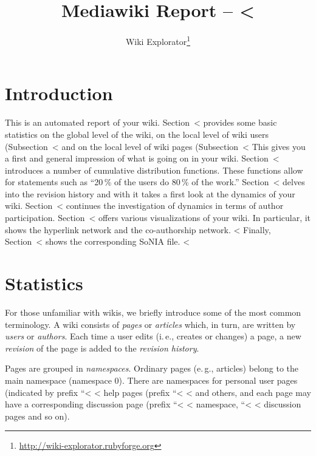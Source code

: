 \documentclass{scrartcl}
\title{Mediawiki Report -- <%
}
\author{Wiki Explorator\footnote{\protect\url{http://wiki-explorator.rubyforge.org}}}
\begin{document}
\maketitle

\section{Introduction} %
\label{sec:introduction}

This is an automated report of your wiki. 
Section~<%
provides some basic statistics on the global level of the wiki,
on the local level of wiki users (Subsection~<%
and on the local level of wiki pages (Subsection~<%
This gives you a first and general impression of what is 
going on in your wiki. 
Section~<%
introduces a number of cumulative distribution functions. 
These functions allow for statements such as ``20\,\% of 
the users do 80\,\% of the work.'' 
Section~<%
delves into the revision history and with it takes a 
first look at the dynamics of your wiki. 
Section~<%
continues the investigation of dynamics in terms of author participation. 
Section~<%
offers various visualizations of your wiki. In particular, it shows 
the hyperlink network and the co-authorship network.
<%
Finally, Section~<%
shows the corresponding SoNIA file.
<%


\section{Statistics} %
\label{sec:statistics}

For those unfamiliar with wikis, we briefly introduce some of the most common terminology. A wiki consists of \emph{pages} or \emph{articles} which, in turn, are written by \emph{users} or \emph{authors}. Each time a user edits (i.\,e., creates or changes) a page, a new \emph{revision} of the page is added to the \emph{revision history}.

Pages are grouped in \emph{namespaces}. Ordinary pages (e.\,g., articles) belong to the main namespace (namespace 0). There are namespaces for personal user pages (indicated by prefix ``<%
<%
help pages (prefix  ``<%
<%
and others, and each page may have a corresponding discussion page
(prefix ``<%
<%
namespace, ``<%
<%
discussion pages and so on).
\end{document}
